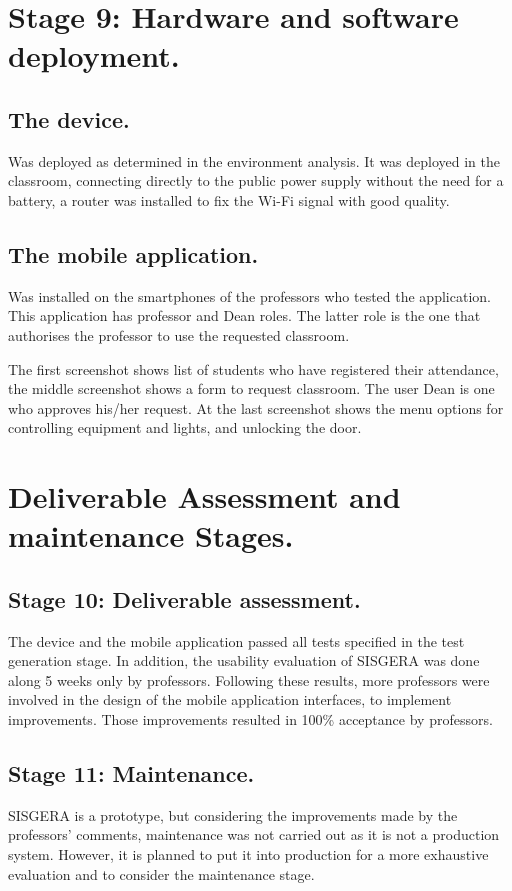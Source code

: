 \documentclass[]{scrartcl}
\begin{document}
\section*{Stage 9: Hardware and software deployment.}
	\subsection*{The device.}
	Was deployed as determined in the environment analysis. It was deployed in the classroom, connecting directly to the public power supply without the need for a battery, a router was installed to fix the Wi-Fi signal with good quality.
	
	\subsection*{The mobile application.}
	Was installed on the smartphones of the professors who tested the application. This application has professor and Dean roles. The latter role is the one that authorises the professor to use the requested classroom.
	
	The first screenshot shows list of students who have registered their attendance, the middle screenshot shows a form to request classroom. The user Dean is one who approves his/her request. At the last screenshot shows the menu options for controlling equipment and lights, and unlocking the door.
	
\section*{Deliverable Assessment and maintenance Stages.}
	\subsection*{Stage 10: Deliverable assessment.}
		The device and the mobile application passed all tests specified in the test generation stage. In addition, the usability evaluation of SISGERA was done along 5 weeks only by professors. Following these results, more professors were involved in the design of the mobile application interfaces, to implement improvements. Those improvements resulted in 100\% acceptance by professors.
	
		\subsection*{Stage 11: Maintenance.}
			SISGERA is a prototype, but considering the improvements made by the professors' comments, maintenance was not carried out as it is not a production system. However, it is planned to put it into production for a more exhaustive evaluation and to consider the maintenance stage.
\end{document}
